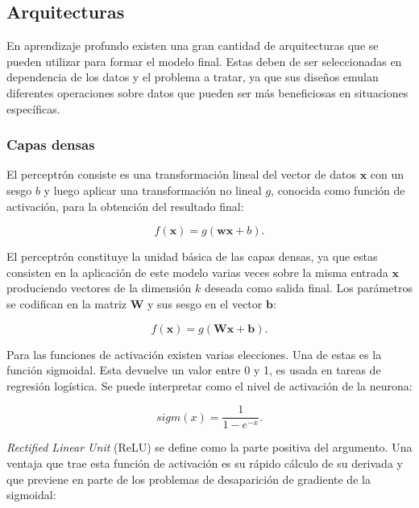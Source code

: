 \subsection{Arquitecturas}

En aprendizaje profundo existen una gran cantidad de arquitecturas que se pueden utilizar para formar el modelo 
final. Estas deben de ser seleccionadas en dependencia de los datos y el problema a tratar, ya que sus diseños 
emulan diferentes operaciones sobre datos que pueden ser más beneficiosas en situaciones específicas.

\subsubsection{Capas densas}

El perceptrón consiste es una transformación lineal del vector de datos $\textbf{x}$ con un sesgo $b$ y 
luego aplicar una transformación no lineal $g$, conocida como función de activación, 
para la obtención del resultado final:

\begin{equation}
	f(\textbf{x}) = g(\textbf{w}\textbf{x} + b).
\end{equation}

El perceptrón constituye la unidad básica de las capas densas, ya que estas consisten en la aplicación
de este modelo varias veces sobre la misma entrada $\textbf{x}$ produciendo vectores de la dimensión $k$ 
deseada como salida final. Los parámetros se codifican en la matriz $\textbf{W}$ y sus sesgo en el 
vector $\textbf{b}$:

\begin{equation}
	f(\textbf{x}) = g(\textbf{Wx} + \textbf{b}).
\end{equation}

Para las funciones de activación existen varias elecciones. Una de estas es la función sigmoidal. 
Esta devuelve un valor entre 0 y 1, es usada en tareas de regresión logística. 
Se puede interpretar como el nivel de activación de la neurona:

\begin{equation}
	sigm(x) = \frac{1}{1-e^{-x}}.
\end{equation}

\emph{Rectified Linear Unit} (ReLU) se define como la parte positiva del argumento. Una ventaja que trae esta 
función de activación es su rápido cálculo de su derivada y que previene en parte de los problemas 
de desaparición de gradiente de la sigmoidal:

